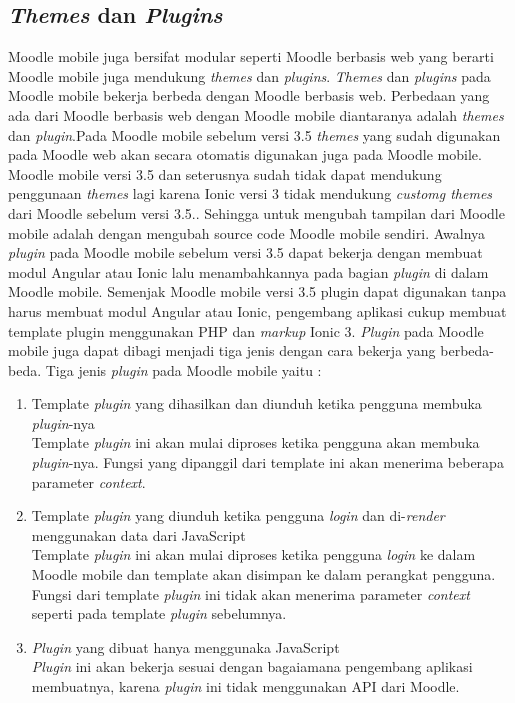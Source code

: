 \subsection{\textit{Themes} dan \textit{Plugins}}
Moodle mobile juga bersifat modular seperti Moodle berbasis web yang berarti Moodle mobile juga mendukung \textit{themes} dan \textit{plugins}. \textit{Themes} dan \textit{plugins} pada Moodle mobile bekerja berbeda dengan Moodle berbasis web. Perbedaan yang ada dari Moodle berbasis web dengan Moodle mobile diantaranya adalah \textit{themes} dan \textit{plugin}.Pada Moodle mobile sebelum versi 3.5 \textit{themes} yang sudah digunakan pada Moodle web akan secara otomatis digunakan juga pada Moodle mobile. Moodle mobile versi 3.5 dan seterusnya sudah tidak dapat mendukung penggunaan \textit{themes} lagi karena Ionic versi 3 tidak mendukung \textit{customg themes} dari Moodle sebelum versi 3.5.\cite{Moodlemobile:themes}. Sehingga untuk mengubah tampilan dari Moodle mobile adalah dengan mengubah source code Moodle mobile sendiri. Awalnya \textit{plugin} pada Moodle mobile sebelum versi 3.5 dapat bekerja dengan membuat modul Angular atau Ionic lalu menambahkannya pada bagian \textit{plugin} di dalam Moodle mobile. Semenjak Moodle mobile versi 3.5 plugin dapat digunakan tanpa harus membuat modul Angular atau Ionic, pengembang aplikasi cukup membuat template plugin menggunakan PHP dan \textit{markup} Ionic 3\cite{Moodlemobile:plugin}. \textit{Plugin} pada Moodle mobile juga dapat dibagi menjadi tiga jenis dengan cara bekerja yang berbeda-beda. Tiga jenis \textit{plugin} pada Moodle mobile yaitu :

	\begin{enumerate}
	\item Template \textit{plugin} yang dihasilkan dan diunduh ketika pengguna membuka \textit{plugin}-nya\\
		Template \textit{plugin} ini akan mulai diproses ketika pengguna akan membuka \textit{plugin}-nya. Fungsi yang dipanggil dari template ini akan menerima beberapa parameter \textit{context}.
		
	\item Template \textit{plugin} yang diunduh ketika pengguna \textit{login} dan di-\textit{render} menggunakan data dari JavaScript \\
		Template \textit{plugin} ini  akan mulai diproses ketika pengguna \textit{login} ke dalam Moodle mobile dan template akan disimpan ke dalam perangkat pengguna. Fungsi dari template \textit{plugin} ini tidak akan menerima parameter \textit{context} seperti pada template \textit{plugin} sebelumnya.
	\item \textit{Plugin} yang dibuat hanya menggunaka JavaScript \\
		\textit{Plugin} ini akan bekerja sesuai dengan bagaiamana pengembang aplikasi membuatnya, karena \textit{plugin} ini tidak menggunakan API dari Moodle.
	\end{enumerate}

